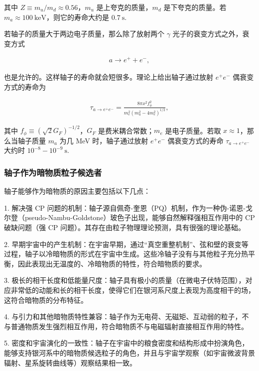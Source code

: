 其中 $Z\equiv m_u/m_d \approx 0.56$，$m_u$ 是上夸克的质量，$m_d$ 是下夸克的质量。若 $m_a\approx 100~\mathrm{keV}$，则它的寿命大约是 $0.7~\mathrm{s} .$

若轴子的质量大于两边电子质量，那么除了放射两个 $\gamma$ 光子的衰变方式之外，衰变方式

\begin{align}
a \to e^+ + e^-,
\end{align}

也是允许的。这样轴子的寿命就会短很多。理论上给出轴子通过放射 $e^+ e^-$ 偶衰变方式的寿命为

\begin{align}
\tau_{a\to e^+ e^-}
=\frac{8 \pi x^2 f_\phi^2}{m_e^2\left(m_a^2-4m_e^2 \right)^{1/2} } ,
\end{align}

其中 $f_\phi\equiv \left(\sqrt{2} G_F \right)^{-1/2}$，$G_F$ 是费米耦合常数；$m_e$ 是电子质量。若取 $x\approx 1$，那么当轴子质量 $m_a$ 为几 MeV 时，轴子通过放射 $e^+ e^-$ 偶衰变方式的寿命 $\tau_{a\to e^+ e^-}$ 大约时 $10^{-8} - 10^{-9}~\mathrm{s} .$

\subsubsection{轴子作为暗物质粒子候选者}

轴子能够作为暗物质的原因主要包括以下几点\cite{duffy2009axions}：

1. 解决强 CP 问题的机制：轴子源自佩奇-奎恩（PQ）机制，作为一种伪-诺恩-戈尔登（pseudo-Nambu-Goldstone）玻色子出现，能够自然解释强相互作用中的 CP 破缺问题（强 CP 问题）。其存在由粒子物理理论预测，具有很强的理论基础。

2. 早期宇宙中的产生机制：在宇宙早期，通过“真空重整机制”、弦和壁的衰变等过程，轴子以冷暗物质的形式在宇宙中生成。这些冷轴子没有与其他粒子充分热平衡，因此表现出无温度的、冷暗物质的特性，符合暗物质的要求。

3. 极长的相干长度和低能量尺度：轴子具有极小的质量（在微电子伏特范围），对应非常低的动能和长的相干长度，使得它们在银河系尺度上表现为高度相干的场，这符合暗物质的分布特征。

4. 与引力和其他暗物质特性兼容：轴子作为无电荷、无磁矩、互动弱的粒子，不与普通物质发生强烈相互作用，符合暗物质不与电磁辐射直接相互作用的特性。

5. 密度和宇宙演化的一致性：轴子在宇宙中的粮食密度和结构形成中扮演角色，能够支持银河系中的暗物质候选粒子的角色，并且与宇宙学观察（如宇宙微波背景辐射、星系旋转曲线等）观察结果相一致。

